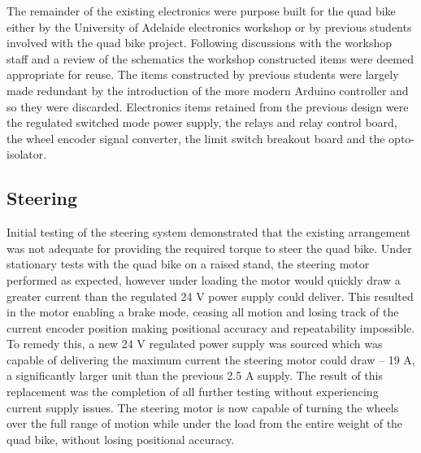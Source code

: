 \documentclass[main.tex]{subfiles}
\begin{document}
The remainder of the existing electronics were purpose built for the quad bike either by the University of Adelaide electronics workshop or by previous students involved with the quad bike project. Following discussions with the workshop staff and a review of the schematics the workshop constructed items were deemed appropriate for reuse. The items constructed by previous students were largely made redundant by the introduction of the more modern Arduino controller and so they were discarded. Electronics items retained from the previous design were the regulated switched mode power supply, the relays and relay control board, the wheel encoder signal converter, the limit switch breakout board and the opto-isolator. 


\subsection{Steering}
Initial testing of the steering system demonstrated that the existing arrangement was not adequate for providing the required torque to steer the quad bike. Under stationary tests with the quad bike on a raised stand, the steering motor performed as expected, however under loading the motor would quickly draw a greater current than the regulated 24 V power supply could deliver. This resulted in the motor enabling a brake mode, ceasing all motion and losing track of the current encoder position making positional accuracy and repeatability impossible. To remedy this, a new 24 V regulated power supply was sourced which was capable of delivering the maximum current the steering motor could draw – 19 A, a significantly larger unit than the previous 2.5 A supply. The result of this replacement was the completion of all further testing without experiencing current supply issues. The steering motor is now capable of turning the wheels over the full range of motion while under the load from the entire weight of the quad bike, without losing positional accuracy.
\end{document}
